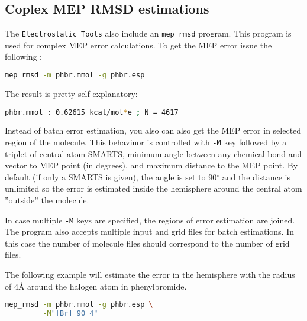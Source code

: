 \documentclass[10pt,a4paper]{article}
\begin{document}
\subsection{Coplex MEP RMSD estimations}
The \lstinline{Electrostatic Tools} also include an \lstinline{mep_rmsd} program.
This program is used for complex MEP error calculations. To get the MEP error issue
the following :
\begin{lstlisting}[language=bash]
mep_rmsd -m phbr.mmol -g phbr.esp
\end{lstlisting}
The result is pretty self explanatory:
\begin{lstlisting}[language=bash]
phbr.mmol : 0.62615 kcal/mol*e ; N = 4617
\end{lstlisting}
Instead of batch error estimation, you also can also get the MEP error in selected 
region of the molecule. This behaviuor is controlled with \lstinline{-M} key followed 
by a triplet of central atom SMARTS, minimum angle between any chemical bond and vector 
to MEP point (in degrees), and maximum distance to the MEP point. By default (if only 
a SMARTS is given), the angle is set to 90$^{\circ}$ and the distance is unlimited so 
the error is estimated inside the hemisphere around the central atom ''outside'' 
the molecule. 

In case multiple \lstinline{-M} keys are specified, the regions of error 
estimation are joined. The program also accepts multiple input and grid files for batch 
estimations. In this case the number of molecule files should correspond to the number 
of grid files.

The following example will estimate the error in the hemisphere with the radius of 4\r{A} around the halogen 
atom in phenylbromide. 
\begin{lstlisting}[language=bash]
mep_rmsd -m phbr.mmol -g phbr.esp \
         -M"[Br] 90 4"
\end{lstlisting}
\end{document}
